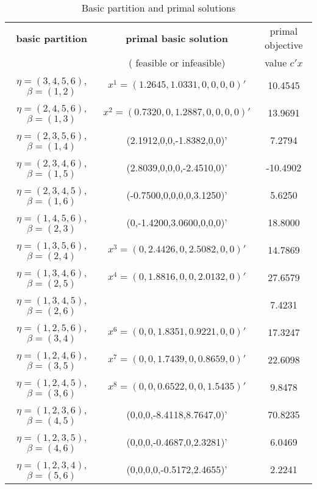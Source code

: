 \begin{table*}[!h]
\centering
\footnotesize
\begin{tabular}{|c|c|c|}\hline

\textbf{basic partition} & \textbf{primal basic solution} & primal objective\\
& ({\color{green} feasible} or {\color{red} infeasible}) & value $c'x$ \\
\hline\hline
$\eta = (3,4,5,6) $, $\beta = (1,2)$ & {\color{green} $x^1=(1.2645, 1.0331, 0,0,0,0)'$} & 10.4545\\\hline
$\eta = (2,4,5,6) $, $\beta = (1,3)$ & {\color{green}  $x^2=(0.7320, 0, 1.2887,0,0,0,0)'$} & 13.9691\\\hline
$\eta = (2,3,5,6) $, $\beta = (1,4)$ & {\color{red} (2.1912,0,0,-1.8382,0,0)'} & 7.2794\\\hline
$\eta = (2,3,4,6) $, $\beta = (1,5)$ & {\color{red} (2.8039,0,0,0,-2.4510,0)'} & -10.4902\\\hline
$\eta = (2,3,4,5) $, $\beta = (1,6)$ & {\color{red} (-0.7500,0,0,0,0,3.1250)'} & 5.6250\\\hline
$\eta = (1,4,5,6) $, $\beta = (2,3)$ & {\color{red} (0,-1.4200,3.0600,0,0,0)'} & 18.8000\\\hline
$\eta = (1,3,5,6) $, $\beta = (2,4)$ & {\color{green}  $x^3=(0,2.4426,0,2.5082,0,0)'$} & 14.7869\\\hline
$\eta = (1,3,4,6) $, $\beta = (2,5)$ & {\color{green}  $x^4=(0,1.8816,0,0,2.0132,0)'$} & 27.6579\\\hline
\cellcolor{gray!20}$\eta = (1,3,4,5) $, $\beta = (2,6)$ & \cellcolor{gray!20}{\color{green}  $x^5=(0,0.3846,0,0,0,1.9615)'$} & \cellcolor{gray!20}7.4231\\\hline
$\eta = (1,2,5,6) $, $\beta = (3,4)$ & {\color{green} $x^6=(0,0,1.8351,0.9221,0,0)'$} & 17.3247\\\hline
$\eta = (1,2,4,6) $, $\beta = (3,5)$ & {\color{green}  $x^7=(0,0,1.7439,0,0.8659,0)'$} & 22.6098\\\hline
$\eta = (1,2,4,5) $, $\beta = (3,6)$ & {\color{green}  $x^8=(0,0,0.6522,0,0,1.5435)'$} & 9.8478 \\\hline
$\eta = (1,2,3,6) $, $\beta = (4,5)$ & {\color{red} (0,0,0,-8.4118,8.7647,0)'} & 70.8235\\\hline
$\eta = (1,2,3,5) $, $\beta = (4,6)$ & {\color{red} (0,0,0,-0.4687,0,2.3281)'} & 6.0469\\\hline
$\eta = (1,2,3,4) $, $\beta = (5,6)$ & {\color{red} (0,0,0,0,-0.5172,2.4655)'} & 2.2241 \\\hline

\end{tabular}
\caption{Basic partition and primal solutions}
\label{tab:primal-dual}
\end{table*}

